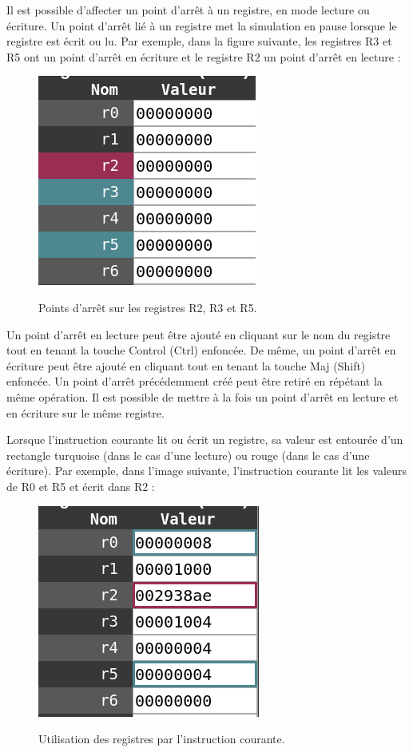 \documentclass{tufte-handout}
\begin{document}
Il est possible d'affecter un point d'arrêt à un registre, en mode lecture ou écriture. Un point d'arrêt lié à un registre met la simulation en pause lorsque le registre est écrit ou lu. Par exemple, dans la figure suivante, les registres R3 et R5 ont un point d'arrêt en écriture et le registre R2 un point d'arrêt en lecture :
\begin{figure}[h!]
\raggedleft
\includegraphics[width=0.45\linewidth]{pics/registres_bkpt.png}
\label{f:regbkpt}
\caption{Points d'arrêt sur les registres R2, R3 et R5.}
\end{figure}

Un point d'arrêt en lecture peut être ajouté en cliquant sur le nom du registre tout en tenant la touche Control (Ctrl) enfoncée. De même, un point d'arrêt en écriture peut être ajouté en cliquant tout en tenant la touche Maj (Shift) enfoncée. Un point d'arrêt précédemment créé peut être retiré en répétant la même opération. Il est possible de mettre à la fois un point d'arrêt en lecture et en écriture sur le même registre.

Lorsque l'instruction courante lit ou écrit un registre, sa valeur est entourée d'un rectangle turquoise (dans le cas d'une lecture) ou rouge (dans le cas d'une écriture). Par exemple, dans l'image suivante, l'instruction courante lit les valeurs de R0 et R5 et écrit dans R2 :
\begin{figure}[h!]
\raggedleft
\includegraphics[width=0.45\linewidth]{pics/registres_statuts.png}
\label{f:regstatut}
\caption{Utilisation des registres par l'instruction courante.}
\end{figure}
\end{document}
